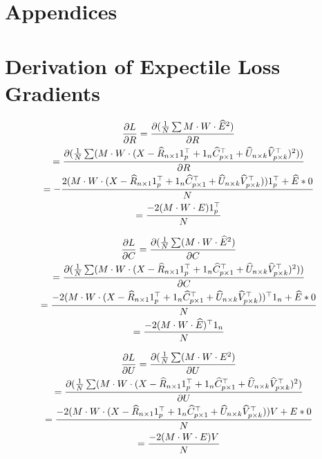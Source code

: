 \documentclass{article}
\begin{document}
\newpage
\section*{Appendices}
\appendix
\section{Derivation of Expectile Loss Gradients} \label{appendix.a}
\begin{gather*}
    \pdv{L}{R} = \pdv{(\frac{1}{N}\sum M \cdot W \cdot \widehat{E}^2)}{R} \\
    = \pdv{(\frac{1}{N}\sum(M \cdot W \cdot (X - \widehat{R}_{n \times 1}1^{\top}_{p} + 1_{n}\widehat{C}_{p \times 1}^{\top} + \widehat{U}_{n \times k}\widehat{V}^{\top}_{p \times k})^2))}{R}\\
    = -\frac{2(M \cdot W \cdot (X - \widehat{R}_{n \times 1}1^{\top}_{p} + 1_{n}\widehat{C}_{p \times 1}^{\top} + \widehat{U}_{n \times k}\widehat{V}^{\top}_{p \times k}))1^{\top}_{p} + \widehat{E} * 0} {N}\\
    = \frac{-2(M \cdot W \cdot E)1_{p}^\top}{N}
\end{gather*}

\begin{gather*}
    \pdv{L}{C} = \pdv{(\frac{1}{N}\sum(M \cdot W \cdot \widehat{E}^2)}{C} \\
    = \pdv{(\frac{1}{N}\sum(M \cdot W \cdot (X - \widehat{R}_{n \times 1}1^{\top}_{p} + 1_{n}\widehat{C}_{p \times 1}^{\top} + \widehat{U}_{n \times k}\widehat{V}^{\top}_{p \times k})^2))}{C}\\
    = \frac{-2(M \cdot W \cdot (X - \widehat{R}_{n \times 1}1^{\top}_{p} + 1_{n}\widehat{C}_{p \times 1}^{\top} + \widehat{U}_{n \times k}\widehat{V}^{\top}_{p \times k}))^\top1_{n} + \widehat{E} * 0}{N}\\
    = \frac{-2(M \cdot W \cdot \widehat{E})^\top1_{n}}{N}
\end{gather*}

\begin{gather*}
    \pdv{L}{U} = \pdv{(\frac{1}{N}\sum(M \cdot W \cdot E^2)}{U} \\
    = \pdv{(\frac{1}{N}\sum(M \cdot W \cdot (X - \widehat{R}_{n \times 1}1^{\top}_{p} + 1_{n}\widehat{C}_{p \times 1}^{\top} + \widehat{U}_{n \times k}\widehat{V}^{\top}_{p \times k})^2)}{U}\\
    = \frac{-2(M \cdot W \cdot (X - \widehat{R}_{n \times 1}1^{\top}_{p} + 1_{n}\widehat{C}_{p \times 1}^{\top} + \widehat{U}_{n \times k}\widehat{V}^{\top}_{p \times k}))V + E * 0}{N}\\
    = \frac{-2(M \cdot W \cdot E)V }{N}
\end{gather*}
\end{document}
